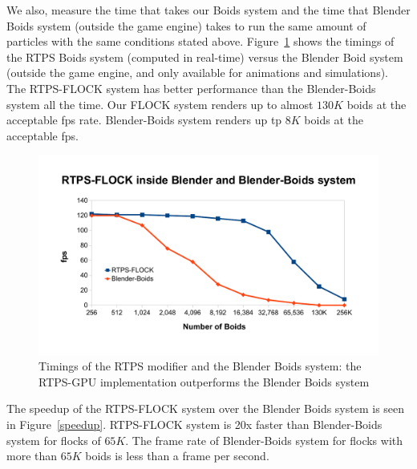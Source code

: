 We also, measure the time that takes our Boids system and the time that Blender Boids system (outside the game engine) takes to run the same amount of particles with the same conditions stated above. Figure~\ref{RTPSvsBlender} shows the timings of the RTPS Boids system (computed in real-time) versus the Blender Boid system (outside the game engine, and only available for animations and simulations). The RTPS-FLOCK system has better performance than the Blender-Boids system all the time. Our FLOCK system renders up to almost $130K$ boids at the acceptable fps rate. Blender-Boids system renders up tp $8K$ boids at the acceptable fps.

\begin{figure}[htbp]
\begin{center}
\includegraphics[scale=0.7]{figures/benchmarks.pdf}
\caption{Timings of the RTPS modifier and the Blender Boids system: the RTPS-GPU implementation outperforms the Blender Boids system}
\label{RTPSvsBlender}
\end{center}
\end{figure}

The speedup of the RTPS-FLOCK system over the Blender Boids system is seen in Figure~\ref{speedup}. RTPS-FLOCK system is 20x faster than Blender-Boids system for flocks of $65K$. The frame rate of Blender-Boids system for flocks with more than $65K$ boids is less than a frame per second.

